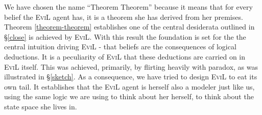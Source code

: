 We have chosen the name ``Theorem Theorem'' because it means 
that for every belief the \textsc{EviL} agent has, it is a theorem  
she has derived from her premises. Theorem \ref{theorem-theorem} 
establishes one of the central desiderata outlined in \S\ref{close} 
is achieved by \textsc{EviL}.  With this result the foundation is 
set for the the central intuition driving \textsc{EviL} - that beliefs are the
consequences of logical deductions.  It is a peculiarity of
\textsc{EviL} that these deductions are carried on in \textsc{EviL}
itself.  This was achieved, primarily, by flirting heavily with
paradox, as was illustrated in \S\ref{sketch}.  
As a consequence, we have tried to design \textsc{EviL}
to eat its own tail. 
It establishes that the \textsc{EviL} agent is
herself also a modeler just like us, using the same logic we are using
to think about her herself, to think about the state space she lives
in.

